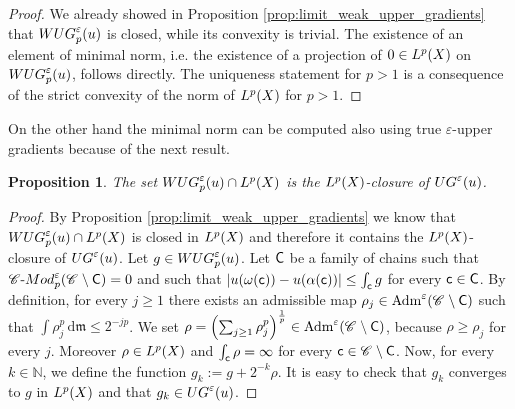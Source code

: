\documentclass[12pt]{amsart}
\newcommand{\N}{\mathbb{N}}
\renewcommand{\d}{{\mathrm d}}
\newcommand{\X}{{\rm X}}
\newcommand{\mm}{\mathfrak m}
\newtheorem{proposition}[theorem]{Proposition}
\theoremstyle{definition}
\newtheorem{remark}[theorem]{Remark}
\newcommand{\cModepsilon}[2]{{\mathscr C}\text{-}{\rm Mod}_{#2}^{#1}}
\newcommand{\sfc}{{\sf c}}
\newcommand{\sfC}{{\sf C}}
\newcommand{\Chain}[1]{\mathscr{C}^{#1}}
\newcommand{\UG}[1]{{\rm UG}^{#1}}
\newcommand{\WUG}[2]{{\rm WUG}_{#1}^{#2}}
\begin{document}
%
\begin{proof}
    We already showed in Proposition \ref{prop:limit_weak_upper_gradients} that $\WUG{p}{\varepsilon}(u)$ is closed, while its convexity is trivial. The existence of an element of minimal norm, i.e. the existence of a projection of $0 \in L^p(\X)$ on $\WUG{p}{\varepsilon}(u)$, follows directly. The uniqueness statement for $p>1$ is a consequence of the strict convexity of the norm of $L^p(\X)$ for $p>1$.
\end{proof}
%
On the other hand the minimal norm can be computed also using true $\varepsilon$-upper gradients because of the next result.
%
\begin{proposition}
    \label{prop:WUG=closure-of-UG}
    The set $\WUG{p}{\varepsilon}(u) \cap L^p(\X)$ is the $L^p(\X)$-closure of $\UG{\varepsilon}(u)$.
\end{proposition}
\begin{proof}
    By Proposition \ref{prop:limit_weak_upper_gradients} we know that $\WUG{p}{\varepsilon}(u) \cap L^p(\X)$ is closed in $L^p(\X)$ and therefore it contains the $L^p(\X)$-closure of $\UG{\varepsilon}(u)$. Let $g\in \WUG{p}{\varepsilon}(u)$. Let $\sfC$ be a family of chains such that $\cModepsilon{\varepsilon}{p}(\Chain{}\setminus \sfC) = 0$ and such that $|u(\omega(\sfc)) - u(\alpha(\sfc))| \le \int_\sfc g$ for every $\sfc \in \sfC$. By definition, for every $j\ge 1$ there exists an admissible map $\rho_j \in \text{Adm}^\varepsilon(\Chain{}\setminus \sfC)$ such that $\int \rho_j^p\,\d\mm \le 2^{-jp}$. We set $\rho = \left(\sum_{j\ge 1} \rho_j^p\right)^{\frac{1}{p}} \in \text{Adm}^\varepsilon(\Chain{}\setminus \sf C)$, because $\rho \ge \rho_j$ for every $j$. Moreover $\rho \in L^p(\X)$ and $\int_\sfc\rho = \infty$ for every $\sfc \in \Chain{}\setminus \sfC$. Now, for every $k\in \N$, we define the function $g_k := g + 2^{-k}\rho$. It is easy to check that $g_k$ converges to $g$ in $L^p(\X)$ and that $g_k \in \UG{\varepsilon}(u)$.
\end{proof}
\end{document}
